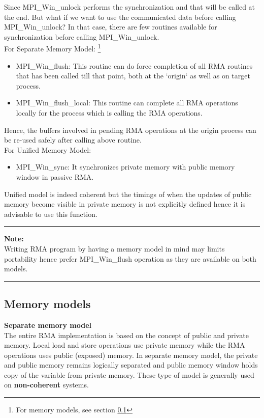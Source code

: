 Since {\ttfamily MPI\_Win\_unlock} performs the synchronization and that will be called at the end. But what if we want to use the communicated data before calling {\ttfamily  MPI\_Win\_unlock}? In that case, there are few routines available for synchronization before calling {\ttfamily MPI\_Win\_unlock}.\\
For Separate Memory Model: \footnote[2]{For memory models, see section \ref{model}}
\begin{itemize}
	\item {\ttfamily MPI\_Win\_flush}: This routine can do force completion of all RMA routines that has been called till that point, both at the `origin` as well as on target process.
	\item {\ttfamily MPI\_Win\_flush\_local}: This routine can complete all RMA operations locally for the process which is calling the RMA operations.
\end{itemize}
Hence, the buffers involved in pending RMA operations at the origin process can be re-used safely after calling above routine.\\
For Unified Memory Model: \footnotemark[2]
\begin{itemize}
	\item {\ttfamily MPI\_Win\_sync}: It synchronizes private memory with public memory window in passive RMA.
\end{itemize}
Unified model is indeed coherent but the timings of when the updates of public memory become visible in private memory is not explicitly defined hence it is advisable to use this function. \vspace{10pt}
\hrule \vspace{5pt} \hspace{-21pt}
\textbf{Note:}\\
Writing RMA program by having a memory model in mind may limits portability hence prefer {\ttfamily MPI\_Win\_flush} operation as they are available on both models. \vspace{5pt}
\hrule

\subsection{Memory models} \label{model}
\textbf{Separate memory model}\\
The entire RMA implementation is based on the concept of public and private memory. Local load and store operations use private memory while the RMA operations uses public (exposed) memory. In separate memory model, the private and public memory remains logically separated and public memory window holds copy of the variable from private memory. These type of model is generally used on \textbf{non-coherent} systems.

